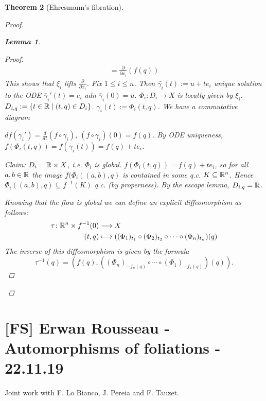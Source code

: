 \documentclass[A4paper, british]{amsart}
\theoremstyle{darkgreentheorem}
\newtheorem{thm}{Theorem}[section]
\newtheorem{lm}[thm]{Lemma}
\theoremstyle{darkbluedefinition}
\theoremstyle{darkredexample}
\theoremstyle{remark}
\newcommand{\1}{\mathbbm{1}}
\newcommand{\tms}{\times}
\newcommand{\sub}{\subseteq}
\begin{document}
\begin{thm}[Ehresmann's fibration]
\begin{proof}
\begin{lm}
\begin{proof}
\begin{multline*}
		    =\frac{\partial}{\partial x_{i}}(f(q))
		\end{multline*}
		This shows that $\xi_{i}$ lifts $\frac{\partial}{\partial x_{i}}$.
		Fix $1\leqslant i\leqslant n$.
		Then $\bar{\gamma_{i}}(t):=u+te_{i}$ unique solution to the ODE $\bar{\gamma}_{i}'(t)=e_{i}$ adn $\bar{\gamma}_{i}(0)=u$.
		$\Phi_{i}\colon D_{i}\to X$ is locally given by $\xi_{i}$.
		$D_{i,q}:=\{t\in \mathbb{R}\mid (t,q)\in D_{i}\}$.
		$\gamma_{i}(t):=\Phi_{i}(t,q)$.
		We have a commutative diagram
		\begin{center}
		\end{center}
		$df(\gamma_{i}')=\frac{d}{dt}(f\circ \gamma_{i})$, $(f\circ \gamma_{i})(0)=f(q)$.
		By ODE uniqueness, $f(\Phi_{i}(t,q))=f(\gamma_{i}(t))=f(q)+te_{i}$.

		Claim: $D_{i}=\R\tms X$, i.e. $\Phi_{i}$ is global.
		$f(\Phi_{i}(t,q))=f(q)+te_{i}$, so for all $a,b\in \mathbb{R}$ the image $f(\Phi_{i}((a,b),q)$ is contained in some q.c. $K\sub \R^{n}$.
		Hence $\Phi_{i}((a,b),q)\sub f^{-1}(K)$ q.c. (by properness).
		By the escape lemma, $D_{i,q}=\mathbb{R}$.
		
		Knowing that the flow is global we can define an explicit diffeomorphism as follows:
		\begin{align*}
		    \tau\colon \R^{n}\tms f^{-1}(0) & \longrightarrow X \\
		    (t,q) &\longmapsto ((\Phi_{1})_{t_{1}}\circ (\Phi_{2})_{t_{2}}\circ \cdots \circ (\Phi_{n})_{t_{n}})(q)
		\end{align*}
		The inverse of this diffeomorphism is given by the formula
		\[ \tau^{-1}(q)=(f(q),((\Phi_{n})_{-f_{n}(q)}\circ \cdots \circ (\Phi_{1})_{-f_{1}(q)})(q)). \]
	    \end{proof}
	\end{lm}
    \end{proof}
\end{thm}

\section{[FS] Erwan Rousseau - Automorphisms of foliations - 22.11.19}

Joint work with F. Lo Bianco, J. Pereia and F. Tauzet.
\end{document}
